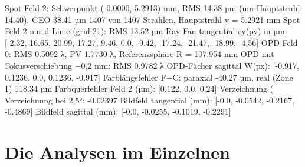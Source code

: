 \documentclass[11pt,a4paper,openany]{book}
\begin{document}
\begin{ausgabe}
Spot Feld 2: Schwerpunkt (-0.0000, 5.2913) mm, RMS 14.38 µm (um Hauptstrahl 14.40), GEO 38.41 µm
  1407 von 1407 Strahlen, Hauptstrahl y = 5.2921 mm
Spot Feld 2 nur d-Linie (grid:21): RMS 13.52 µm
Ray Fan tangential ey(py) in µm: [-2.32, 16.65, 20.99, 17.27, 9.46, 0.0, -9.42, -17.24, -21.47, -18.99, -4.56]
OPD Feld 0: RMS 0.5092 λ, PV 1.7730 λ, Referenzsphäre R = 107.954 mm
OPD mit Fokusverschiebung −0,2 mm: RMS 0.9782 λ
OPD-Fächer sagittal W(px): [-0.917, 0.1236, 0.0, 0.1236, -0.917]
Farblängsfehler F−C: paraxial -40.27 µm, real (Zone 1) 118.34 µm
Farbquerfehler Feld 2 (µm): [0.122, 0.0, 0.24]
Verzeichnung (%
Verzeichnung bei 2,5°: -0.02397 %
Bildfeld tangential (mm): [-0.0, -0.0542, -0.2167, -0.4869]
Bildfeld sagittal   (mm): [-0.0, -0.0255, -0.1019, -0.2291]
\end{ausgabe}

\section{Die Analysen im Einzelnen}
\end{document}
